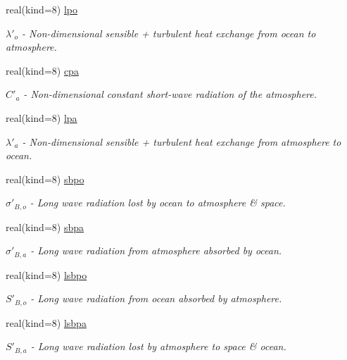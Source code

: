 \begin{DoxyCompactItemize}
real(kind=8) \hyperlink{namespaceparams_aa668795ed0785dc42a43980c82ba058e}{lpo}
\begin{DoxyCompactList}\small\item\em $\lambda'_o$ -\/ Non-\/dimensional sensible + turbulent heat exchange from ocean to atmosphere. \end{DoxyCompactList}\item 
real(kind=8) \hyperlink{namespaceparams_a5194d820b8962ee2b99a455a2892a2e2}{cpa}
\begin{DoxyCompactList}\small\item\em $C'_a$ -\/ Non-\/dimensional constant short-\/wave radiation of the atmosphere. \end{DoxyCompactList}\item 
real(kind=8) \hyperlink{namespaceparams_abc64b12ee840e1d848729ea868221117}{lpa}
\begin{DoxyCompactList}\small\item\em $\lambda'_a$ -\/ Non-\/dimensional sensible + turbulent heat exchange from atmosphere to ocean. \end{DoxyCompactList}\item 
real(kind=8) \hyperlink{namespaceparams_a630ac570afd5c9c7030ca416f3a860a4}{sbpo}
\begin{DoxyCompactList}\small\item\em $\sigma'_{B,o}$ -\/ Long wave radiation lost by ocean to atmosphere \& space. \end{DoxyCompactList}\item 
real(kind=8) \hyperlink{namespaceparams_abf0cb93f1f5b90e3cfd2c70d88c92d38}{sbpa}
\begin{DoxyCompactList}\small\item\em $\sigma'_{B,a}$ -\/ Long wave radiation from atmosphere absorbed by ocean. \end{DoxyCompactList}\item 
real(kind=8) \hyperlink{namespaceparams_ae29ef1b81e159c7bff47aa8303710583}{lsbpo}
\begin{DoxyCompactList}\small\item\em $S'_{B,o}$ -\/ Long wave radiation from ocean absorbed by atmosphere. \end{DoxyCompactList}\item 
real(kind=8) \hyperlink{namespaceparams_a2422205ab99f9886746672ee91b775a8}{lsbpa}
\begin{DoxyCompactList}\small\item\em $S'_{B,a}$ -\/ Long wave radiation lost by atmosphere to space \& ocean. \end{DoxyCompactList}\item 

\end{DoxyCompactItemize}
